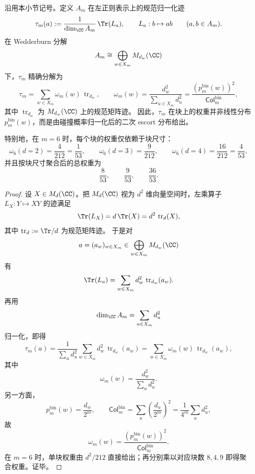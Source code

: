 \begin{theorem}\label{thm:conclusion-foldbin-groupoid-regular-trace-escort}
沿用本小节记号。定义 \(A_m\) 在左正则表示上的规范归一化迹
\[
\tau_m(a):=\frac{1}{\dim_{\CC}A_m}\,\Tr(L_a),
\qquad
L_a:b\mapsto ab
\qquad (a,b\in A_m).
\]
在 Wedderburn 分解
\[
A_m\cong \bigoplus_{w\in X_m}M_{d_w}(\CC)
\]
下，\(\tau_m\) 精确分解为
\[
\tau_m=\sum_{w\in X_m}\omega_m(w)\,\operatorname{tr}_{d_w},
\qquad
\omega_m(w)=\frac{d_w^2}{\sum_{u\in X_m}d_u^2}
=
\frac{(p_m^{\mathrm{bin}}(w))^2}{\mathsf{Col}^{\mathrm{bin}}_m},
\]
其中 \(\operatorname{tr}_{d_w}\) 为 \(M_{d_w}(\CC)\) 上的规范矩阵迹。
因此，\(\tau_m\) 在块上的权重并非线性分布 \(p_m^{\mathrm{bin}}(w)\)，而是由碰撞概率归一化后的二次 escort 分布给出。

特别地，在 \(m=6\) 时，每个块的权重仅依赖于块尺寸：
\[
\omega_6(d=2)=\frac{4}{212}=\frac{1}{53},
\qquad
\omega_6(d=3)=\frac{9}{212},
\qquad
\omega_6(d=4)=\frac{16}{212}=\frac{4}{53},
\]
并且按块尺寸聚合后的总权重为
\[
\frac{8}{53},\qquad \frac{9}{53},\qquad \frac{36}{53}.
\]
\end{theorem}
\begin{proof}
设 \(X\in M_d(\CC)\)。把 \(M_d(\CC)\) 视为 \(d^2\) 维向量空间时，左乘算子 \(L_X:Y\mapsto XY\) 的迹满足
\[
\Tr(L_X)=d\,\Tr(X)=d^2\,\operatorname{tr}_d(X),
\]
其中 \(\operatorname{tr}_d:=\Tr/d\) 为规范矩阵迹。
于是对
\[
a=(a_w)_{w\in X_m}\in \bigoplus_{w\in X_m}M_{d_w}(\CC)
\]
有
\[
\Tr(L_a)=\sum_{w\in X_m} d_w^2\,\operatorname{tr}_{d_w}(a_w).
\]
再用
\[
\dim_{\CC}A_m=\sum_{u\in X_m}d_u^2
\]
归一化，即得
\[
\tau_m(a)=\frac{1}{\sum_u d_u^2}\sum_{w\in X_m}d_w^2\,\operatorname{tr}_{d_w}(a_w)
=
\sum_{w\in X_m}\omega_m(w)\,\operatorname{tr}_{d_w}(a_w),
\]
其中
\[
\omega_m(w)=\frac{d_w^2}{\sum_u d_u^2}.
\]
另一方面，
\[
p_m^{\mathrm{bin}}(w)=\frac{d_w}{2^m},
\qquad
\mathsf{Col}^{\mathrm{bin}}_m=\sum_u\left(\frac{d_u}{2^m}\right)^2
=
\frac{1}{4^m}\sum_u d_u^2,
\]
故
\[
\omega_m(w)=\frac{(p_m^{\mathrm{bin}}(w))^2}{\mathsf{Col}^{\mathrm{bin}}_m}.
\]
在 \(m=6\) 时，单块权重由 \(d^2/212\) 直接给出；再分别乘以对应块数 \(8,4,9\) 即得聚合权重。证毕。
\end{proof}

